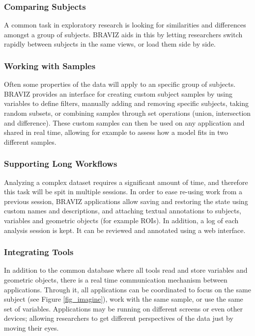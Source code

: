 \documentclass[twocolumn]{svjour3}
\begin{document}
\subsubsection{Comparing Subjects}

A common task in exploratory research is looking for similarities and differences amongst a group of subjects. BRAVIZ aids in this by letting researchers switch rapidly between subjects in the same views, or load them side by side.


\subsubsection{Working with Samples}

Often some properties of the data will apply to an specific group of subjects. BRAVIZ provides an interface for creating custom subject samples by using variables to define filters, manually adding and removing specific subjects, taking random subsets, or combining samples through set operations (union, intersection and difference).  These custom samples can then be used on any application and shared in real time, allowing for example to assess how a model fits in two different samples.

\subsubsection{Supporting Long Workflows}

Analyzing a complex dataset requires a significant amount of time, and therefore this task will be spit in multiple sessions. In order to ease re-using work from a previous session, BRAVIZ applications allow saving and restoring the state using custom names and descriptions, and attaching textual annotations to subjects, variables and geometric objects (for example ROIs). In addition, a log of each analysis session is kept. It can be reviewed and annotated using a web interface.

\subsubsection{Integrating Tools}

In addition to the common database where all tools read and store variables and geometric objects, there is a real time communication mechanism between applications. Through it, all applications can be coordinated to focus on the same subject (see Figure \ref{fig_imagine}), work with the same sample, or use the same set of variables. Applications may be running on different screens or even other devices; allowing researchers to get different perspectives of the data just by moving their eyes.
\end{document}
